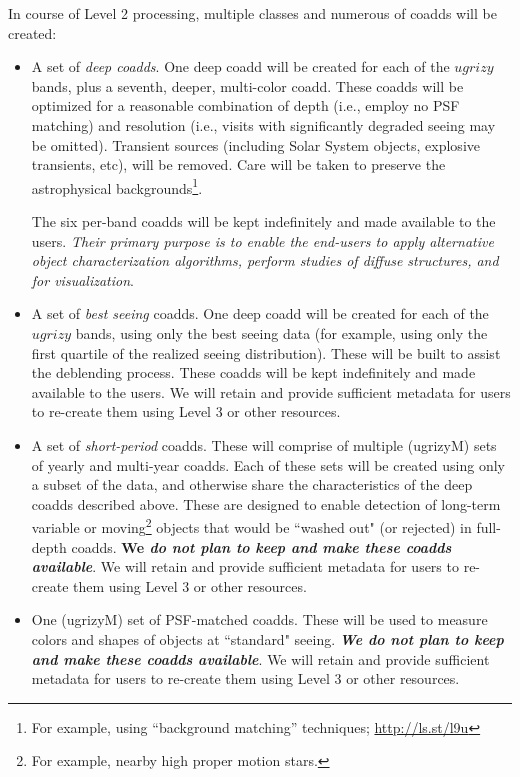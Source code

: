 \documentclass[12pt]{article}
\begin{document}
In course of Level 2 processing, multiple classes and numerous of coadds will be created:
    \begin{itemize}
        \item A set of {\em deep coadds}. One deep coadd will be created for each of the $ugrizy$ bands, plus a seventh, deeper, multi-color coadd. These coadds will be optimized for a reasonable combination of depth (i.e., employ no PSF matching) and resolution (i.e., visits with significantly degraded seeing may be omitted). Transient sources (including Solar System objects, explosive transients, etc), will be removed. Care will be taken to preserve the astrophysical backgrounds\footnote{For example, using ``background matching'' techniques; \url{http://ls.st/l9u}}.

        The six per-band coadds will be kept indefinitely and made available to the users. {\em Their primary purpose is to enable the end-users to apply alternative object characterization algorithms, perform studies of diffuse structures, and for visualization}.

               \item A set of {\em best seeing} coadds. One deep coadd will be created for each of the $ugrizy$ bands, using only the best seeing data (for example, using only the first quartile of the realized seeing distribution). These will be built to assist the deblending process. These coadds will be kept indefinitely and made available to the users.
We will retain and provide sufficient metadata for users to re-create them using Level 3 or other resources.

               \item A set of {\em short-period} coadds. These will comprise of multiple (ugrizyM) sets of yearly and multi-year coadds. Each of these sets will be created using only a subset of the data, and otherwise share the characteristics of the deep coadds described above. These are designed to enable detection of long-term variable or moving\footnote{For example, nearby high proper motion stars.} objects that would be ``washed out" (or rejected) in full-depth coadds. {\bf We \em do not plan to keep and make these coadds available}. We will retain and provide sufficient metadata for users to re-create them using Level 3 or other resources.

        \item One (ugrizyM) set of PSF-matched coadds. These will be used to measure colors and shapes of objects at ``standard" seeing. {\bf \em We do not plan to keep and make these coadds available}. We will retain and provide sufficient metadata for users to re-create them using Level 3 or other resources.
    \end{itemize}
\end{document}
